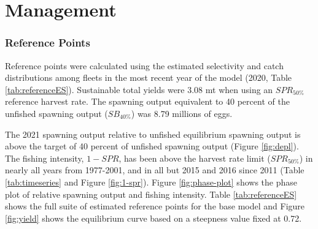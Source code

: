 \documentclass[11pt,
  english,
  a4paper,
]{article}
\begin{document}
\tagstructend


\hypertarget{management}{%
\section{Management}\label{management}}

\leavevmode\tagmcend\tagstructend


\hypertarget{reference-points}{%
\subsubsection{Reference Points}\label{reference-points}}

\leavevmode\tagmcend\tagstructend


Reference points were calculated using the estimated selectivity and catch distributions among fleets in the most recent year of the model (2020, Table \ref{tab:referenceES}). Sustainable total yields were 3.08 mt when using an {\(SPR_{50\%}\)\leavevmode\tagmcend\tagstructend} reference harvest rate. The spawning output equivalent to 40 percent of the unfished spawning output ({\(SB_{40\%}\)\leavevmode\tagmcend\tagstructend}) was 8.79 millions of eggs.

\leavevmode\tagmcend\tagstructend\par


The 2021 spawning output relative to unfished equilibrium spawning output is above the target of 40 percent of unfished spawning output (Figure \ref{fig:depl}). The fishing intensity, {\(1-SPR\)\leavevmode\tagmcend\tagstructend}, has been above the harvest rate limit ({\(SPR_{50\%}\)\leavevmode\tagmcend\tagstructend}) in nearly all years from 1977-2001, and in all but 2015 and 2016 since 2011 (Table \ref{tab:timeseries} and Figure \ref{fig:1-spr}). Figure \ref{fig:phase-plot} shows the phase plot of relative spawning output and fishing intensity. Table \ref{tab:referenceES} shows the full suite of estimated reference points for the base model and Figure \ref{fig:yield} shows the equilibrium curve based on a steepness value fixed at 0.72.
\end{document}
